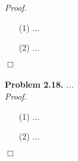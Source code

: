 \documentclass{article}
\begin{document}
\emph{Proof.}
\begin{enumerate}
\item[(1)]
  ...

\item[(2)]
  ...
\end{enumerate}
$\Box$ \\\\






\textbf{Problem 2.18.}
\emph{...} \\



\emph{Proof.}
\begin{enumerate}
\item[(1)]
  ...

\item[(2)]
  ...
\end{enumerate}
$\Box$ \\\\



\end{document}
